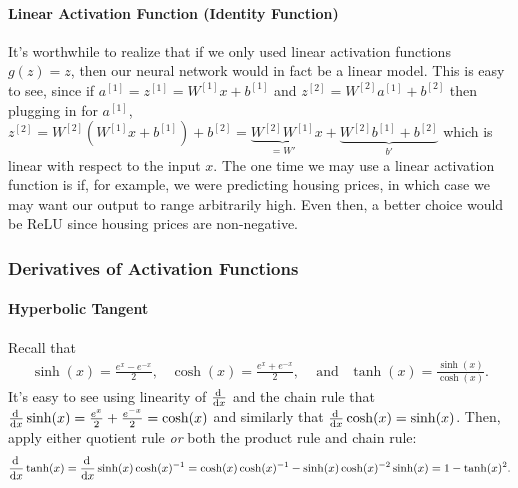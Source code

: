 \documentclass[12pt]{article}
\begin{document}
\paragraph{Linear Activation Function (Identity Function)} It's worthwhile to realize that if we only used linear activation functions $g(z) = z$, then our neural network would in fact be a linear model. This is easy to see, since if $a^{[1]} = z^{[1]} = W^{[1]} x + b^{[1]}$ and $z^{[2]} = W^{[2]} a^{[1]} + b^{[2]}$ then plugging in for $a^{[1]}$, $z^{[2]} = W^{[2]} (W^{[1]} x + b^{[1]}) + b^{[2]} = \underbrace{W^{[2]}W^{[1]}}_{=W'}x + \underbrace{W^{[2]}b^{[1]} + b^{[2]}}_{b'}$ which is linear with respect to the input $x$. The one time we may use a linear activation function is if, for example, we were predicting housing prices, in which case we may want our output to range arbitrarily high. Even then, a better choice would be ReLU since housing prices are non-negative.

\subsubsection{Derivatives of Activation Functions} 
\paragraph{Hyperbolic Tangent}
Recall that 
\begin{align*}   \sinh(x) = \frac{e^x - e^{-x}}{2}, \hspace{10pt} 
  \cosh(x) = \frac{e^x + e^{-x}}{2}, \hspace{10pt} \textrm{ and } \hspace{5pt}
  \tanh(x) = \frac{\sinh(x)}{\cosh(x)}. \end{align*}
It's easy to see using linearity of $\frac{\operatorname{d}\!{\,}}{\operatorname{d}\!{x}}$ and the chain rule that $\frac{\operatorname{d}\!{\,}}{\operatorname{d}\!{x}}  \sinh(x) = \frac{e^x}{2} + \frac{e^{-x}}{2} = \cosh(x)$ and similarly that $\frac{\operatorname{d}\!{\,}}{\operatorname{d}\!{x}}\cosh(x) = \sinh(x)$. Then, apply either quotient rule \emph{or} both the product rule and chain rule:
\begin{align}
  \label{eq: ddxtanh}
  \frac{\operatorname{d}\!{\,}}{\operatorname{d}\!{x}} \tanh(x) = \frac{\operatorname{d}\!{\,}}{\operatorname{d}\!{x}} \sinh(x) \cosh(x)^{-1} = \cosh(x) \cosh(x)^{-1} - \sinh(x)\cosh(x)^{-2}\sinh(x) = 1 - \tanh(x)^2. \end{align}
\end{document}
